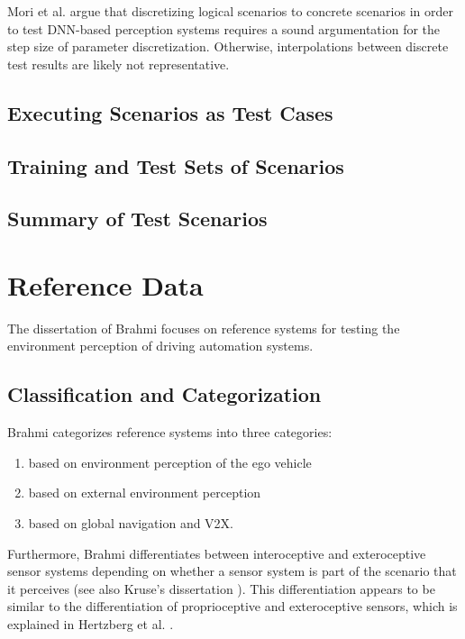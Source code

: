 \documentclass[conference]{IEEEtran}
\newcommand{\new}[1]{{\color{my-red}#1}}
\begin{document}
Mori et al. \cite{Mori2022discrete} argue that discretizing logical scenarios to concrete scenarios in order to test DNN-based perception systems requires a sound argumentation for the step size of parameter discretization. 
Otherwise, interpolations between discrete test results are likely not representative.

\subsection{Executing Scenarios as Test Cases}
\label{sec:executing_scenarios}
\subsection{Training and Test Sets of Scenarios}
\label{sec:scenarios_different_sets}
\subsection{Summary of Test Scenarios}




\section{Reference Data}
\label{sec:axis_ref_data}

The dissertation of Brahmi \cite{Brahmi2020diss} focuses on reference systems for testing the environment perception of driving automation systems. 

\subsection{\new{Classification and Categorization}}
Brahmi \cite{Brahmi2020diss} categorizes reference systems into three categories:
\begin{enumerate}[I]
\item based on environment perception of the ego vehicle
\item based on external environment perception
\item based on global navigation and V2X.
\end{enumerate}
Furthermore, Brahmi \cite{Brahmi2020diss} differentiates between interoceptive and exteroceptive sensor systems depending on whether a sensor system is part of the scenario that it perceives (see also Kruse's dissertation \cite{Kruse2013mehrobjekt}). 
This differentiation appears to be similar to the differentiation of proprioceptive and exteroceptive sensors, which is explained in Hertzberg et al. \cite{Hertzberg2012roboter}.
\end{document}
